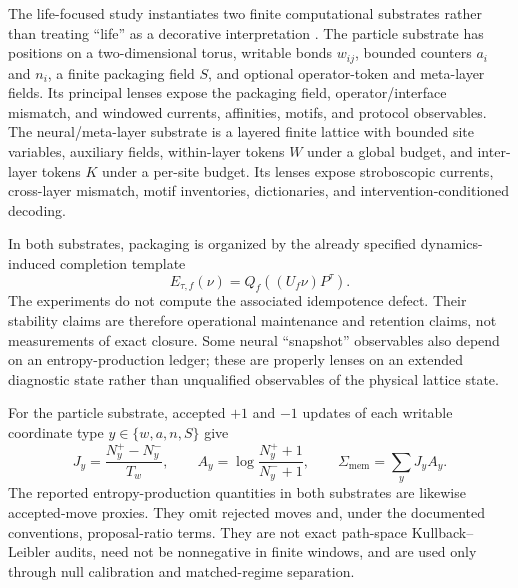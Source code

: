 The life-focused study instantiates two finite computational
substrates rather than treating ``life'' as a decorative interpretation
\citep{Tsiokos2026Life}.  The particle substrate has positions on a
two-dimensional torus, writable bonds $w_{ij}$, bounded counters $a_i$ and
$n_i$, a finite packaging field $S$, and optional operator-token and
meta-layer fields.  Its principal lenses expose the packaging field,
operator/interface mismatch, and windowed currents, affinities, motifs, and
protocol observables.  The neural/meta-layer substrate is a layered finite
lattice with bounded site variables, auxiliary fields, within-layer tokens
$W$ under a global budget, and inter-layer tokens $K$ under a per-site
budget.  Its lenses expose stroboscopic currents, cross-layer mismatch,
motif inventories, dictionaries, and intervention-conditioned decoding.

In both substrates, packaging is organized by the already specified
dynamics-induced completion template
\[
E_{\tau,f}(\nu)=Q_f\!\left((U_f\nu)P^\tau\right).
\]
The experiments do not compute the associated idempotence defect.  Their
stability claims are therefore operational maintenance and retention claims,
not measurements of exact closure.  Some neural ``snapshot'' observables
also depend on an entropy-production ledger; these are properly lenses on an
extended diagnostic state rather than unqualified observables of the
physical lattice state.

For the particle substrate, accepted $+1$ and $-1$ updates of each writable
coordinate type $y\in\{w,a,n,S\}$ give
\[
J_y=\frac{N_y^+-N_y^-}{T_w},
\qquad
A_y=\log\frac{N_y^++1}{N_y^-+1},
\qquad
\Sigma_{\mathrm{mem}}=\sum_y J_yA_y.
\]
The reported entropy-production quantities in both substrates are likewise
accepted-move proxies.  They omit rejected moves and, under the documented
conventions, proposal-ratio terms.  They are not exact path-space
Kullback--Leibler audits, need not be nonnegative in finite windows, and are
used only through null calibration and matched-regime separation.

